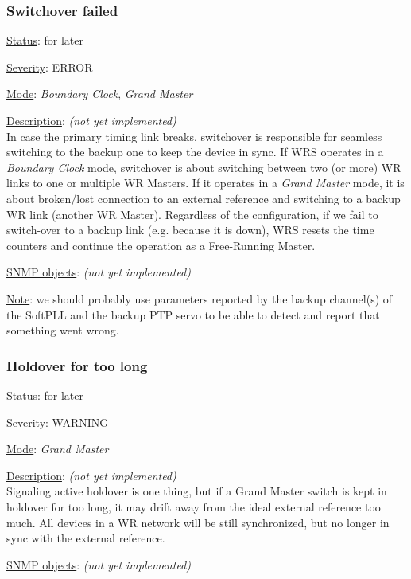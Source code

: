 \subsubsection{\bf Switchover failed}
		\begin{pck_descr}
			\item [] \underline{Status}: for later
			\item [] \underline{Severity}: ERROR
			\item [] \underline{Mode}: \emph{Boundary Clock}, \emph{Grand Master}
			\item [] \underline{Description}: \emph{(not yet implemented)}\\
				In case the primary timing link breaks, switchover is responsible for
				seamless switching to the backup one to keep the device in sync. If WRS
				operates in a \emph{Boundary Clock} mode, switchover is about switching
				between two (or more) WR links to one or multiple WR Masters. If it
				operates in a \emph{Grand Master} mode, it is about broken/lost
				connection to an external reference and switching to a backup WR link
				(another WR Master). Regardless of the configuration, if we fail to
				switch-over to a backup link (e.g. because it is down), WRS resets
				the time counters and continue the operation as a Free-Running Master.
			\item [] \underline{SNMP objects}: \emph{(not yet implemented)}
			\item [] \underline{Note}: we should probably use parameters reported by
				the backup channel(s) of the SoftPLL and the backup PTP servo to be able
				to detect and report that something went wrong.
		\end{pck_descr}

\subsubsection{\bf Holdover for too long}
		\begin{pck_descr}
			\item [] \underline{Status}: for later
			\item [] \underline{Severity}: WARNING
			\item [] \underline{Mode}: \emph{Grand Master}
			\item [] \underline{Description}: \emph{(not yet implemented)}\\
				Signaling active holdover is one thing, but if a Grand Master switch is
				kept in holdover for too long, it may drift away from the ideal external
				reference too much. All devices in a WR network will be still
				synchronized, but no longer in sync with the external reference.
			\item [] \underline{SNMP objects}: \emph{(not yet implemented)}
		\end{pck_descr}

